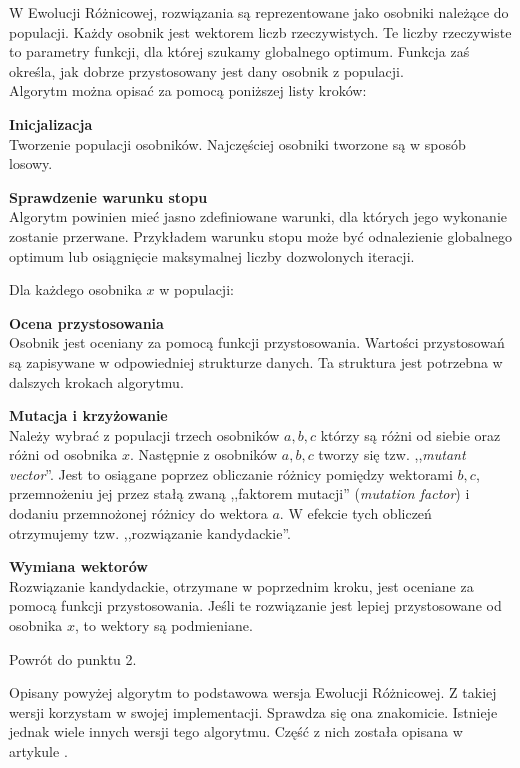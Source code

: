 W Ewolucji Różnicowej, rozwiązania są reprezentowane jako osobniki należące do populacji. Każdy osobnik jest wektorem liczb rzeczywistych. Te liczby rzeczywiste to parametry funkcji, dla której szukamy globalnego optimum. Funkcja zaś określa, jak dobrze przystosowany jest dany osobnik z populacji. \\
Algorytm można opisać za pomocą poniższej listy kroków:
\begin{enumerate*}
\item \textbf{Inicjalizacja} \\
Tworzenie populacji osobników. Najczęściej osobniki tworzone są w sposób losowy.
\item \textbf{Sprawdzenie warunku stopu} \\
Algorytm powinien mieć jasno zdefiniowane warunki, dla których jego wykonanie zostanie przerwane. Przykładem warunku stopu może być odnalezienie globalnego optimum lub osiągnięcie maksymalnej liczby dozwolonych iteracji.
\item Dla każdego osobnika $x$ w populacji:
\begin{enumerate*}
\item \textbf{Ocena przystosowania} \\
Osobnik jest oceniany za pomocą funkcji przystosowania. Wartości przystosowań są zapisywane w odpowiedniej strukturze danych. Ta struktura jest potrzebna w dalszych krokach algorytmu.
\item \textbf{Mutacja i krzyżowanie} \\
Należy wybrać z populacji trzech osobników $a, b, c$ którzy są różni od siebie oraz różni od osobnika $x$. Następnie z osobników $a, b, c$ tworzy się tzw. ,,\textit{mutant vector}''. Jest to osiągane poprzez obliczanie różnicy pomiędzy wektorami $b, c$, przemnożeniu jej przez stałą zwaną ,,faktorem mutacji'' (\textit{mutation factor}) i dodaniu przemnożonej różnicy do wektora $a$.
W efekcie tych obliczeń otrzymujemy tzw. ,,rozwiązanie kandydackie''.
\item \textbf{Wymiana wektorów} \\
Rozwiązanie kandydackie, otrzymane w poprzednim kroku, jest oceniane za pomocą funkcji przystosowania. Jeśli te rozwiązanie jest lepiej przystosowane od osobnika $x$, to wektory są podmieniane.
\end{enumerate*}
\item Powrót do punktu 2.
\end{enumerate*}

Opisany powyżej algorytm to podstawowa wersja Ewolucji Różnicowej. Z takiej wersji korzystam w swojej implementacji. Sprawdza się ona znakomicie. Istnieje jednak wiele innych wersji tego algorytmu. Część z nich została opisana w artykule \cite{de:tutorial}.

